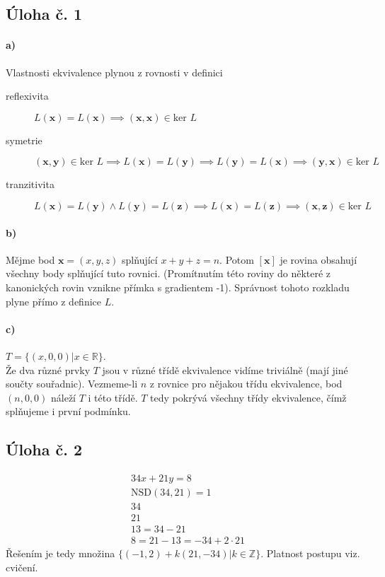 \documentclass{scrartcl}
\begin{document}
\subsection*{Úloha č. 1}
\paragraph{a)} Vlastnosti ekvivalence plynou z rovnosti v definici
\begin{description}
        \item[reflexivita] $L(\textbf{x}) = L(\textbf{x}) \implies (\textbf{x}, \textbf{x}) \in \text{ker } L $
        \item[symetrie] $(\textbf{x}, \textbf{y}) \in \text{ker } L \implies L(\textbf{x}) = L(\textbf{y}) \implies L(\textbf{y}) = L(\textbf{x}) \implies (\textbf{y}, \textbf{x}) \in \text{ker } L$
        \item[tranzitivita] $L(\textbf{x}) = L(\textbf{y}) \land L(\textbf{y}) = L(\textbf{z}) \implies L(\textbf{x}) = L(\textbf{z}) \implies (\textbf{x}, \textbf{z}) \in \text{ker } L$  
\end{description}

\paragraph{b)}
Mějme bod $\textbf{x} = (x,y,z)$ splňující $x+y+z = n$. Potom $[\textbf{x}]$ je rovina obsahují všechny body splňující tuto rovnici. (Promítnutím této roviny do některé z kanonických rovin vznikne přímka s gradientem -1). Správnost tohoto rozkladu plyne přímo z definice $L$.
\paragraph{c)}
$T = \{(x,0,0) \vert x \in \mathbb{R}\}$.\\
Že dva různé prvky $T$ jsou v různé třídě ekvivalence vidíme triviálně (mají jiné součty souřadnic). Vezmeme-li $n$ z rovnice pro nějakou třídu ekvivalence, bod $(n,0,0)$ náleží $T$ i této třídě. $T$ tedy pokrývá všechny třídy ekvivalence, čímž splňujeme i první podmínku.

\subsection*{Úloha č. 2}
\begin{align*}
        & 34x + 21y = 8 \\
        & \text{NSD}(34,21) = 1 \\
        & 34 \\
        & 21 \\
        & 13 = 34 - 21 \\
        & 8 = 21 - 13 = -34 + 2 \cdot 21
\end{align*}
Řešením je tedy množina $\{(-1,2) + k(21,-34) \vert k \in \mathbb{Z}\}$. Platnost postupu viz. cvičení.
\end{document}
